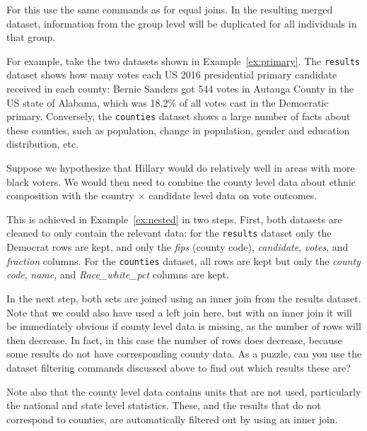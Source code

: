 For this use the same commands as for equal joins.
In the resulting merged dataset, information from the group level will be duplicated for all individuals in that group.

For example, take the two datasets shown in Example~\ref{ex:primary}.
The \texttt{results} dataset shows how many votes each US 2016 presidential primary candidate received in each county:
Bernie Sanders got 544 votes in Autauga County in the US state of Alabama, which was 18.2\% of all votes cast in the
Democratic primary.
Conversely, the \texttt{counties} dataset shows a large number of facts about these counties,
such as population, change in population, gender and education distribution, etc.


Suppose we hypothesize that Hillary would do relatively well in areas with more black voters.
We would then need to combine the county level data about ethnic composition with the country $\times$ candidate
level data on vote outcomes.

This is achieved in Example~\ref{ex:nested} in two steps.
First, both datasets are cleaned to only contain the relevant data:
for the \texttt{results} dataset only the Democrat rows are kept, and only the \emph{fips} (county code), \emph{candidate}, \emph{votes}, and \emph{fraction} columns.
For the \texttt{counties} dataset, all rows are kept but only the \emph{county code}, \emph{name}, and \emph{Race\_white\_pct} columns are kept.


In the next step, both sets are joined using an inner join from the results dataset.
Note that we could also have used a left join here, but with an inner join it will be immediately
obvious if county level data is missing, as the number of rows will then decrease.
In fact, in this case the number of rows does decrease, because some results do not have corresponding county data.
As a puzzle, can you use the dataset filtering commands discussed above to find out which results these are?

Note also that the county level data contains units that are not used, particularly the national and state level statistics.
These, and the results that do not correspond to counties, are automatically filtered out by using an inner join.

